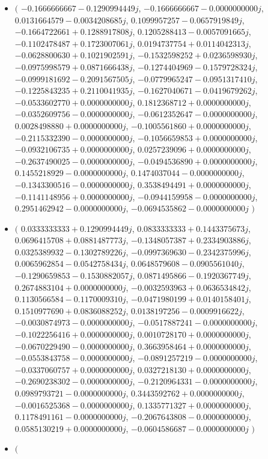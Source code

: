 \documentclass[14pt,a4paper]{article}
\begin{document}
\begin{itemize}
\item
$\big($
$-0.1666666667-0.1290994449j$, $-0.1666666667-0.0000000000j$, $0.0131664579-0.0034208685j$, $0.1099957257-0.0657919849j$, $-0.1664722661+0.1288917808j$, $0.1205288413-0.0057091665j$, $-0.1102478487+0.1723007061j$, $0.0194737754+0.0114042313j$, $-0.0628800630+0.1021902591j$, $-0.1532598252+0.0236598930j$, $-0.0975998579+0.0871666438j$, $-0.1274404969-0.1579728324j$, $-0.0999181692-0.2091567505j$, $-0.0779965247-0.0951317410j$, $-0.1225843235+0.2110041935j$, $-0.1627040671-0.0419679262j$, $-0.0533602770+0.0000000000j$, $0.1812368712+0.0000000000j$, $-0.0352609756-0.0000000000j$, $-0.0612352647-0.0000000000j$, $0.0028498880+0.0000000000j$, $-0.1005561860+0.0000000000j$, $-0.2115332390-0.0000000000j$, $-0.1056659853+0.0000000000j$, $-0.0932106735+0.0000000000j$, $0.0257239096+0.0000000000j$, $-0.2637490025-0.0000000000j$, $-0.0494536890+0.0000000000j$, $0.1455218929-0.0000000000j$, $0.1474037044-0.0000000000j$, $-0.1343300516-0.0000000000j$, $0.3538494491+0.0000000000j$, $-0.1141148956+0.0000000000j$, $-0.0944159958-0.0000000000j$, $0.2951462942-0.0000000000j$, $-0.0694535862-0.0000000000j$
$\big)$
\item
$\big($
$0.0333333333+0.1290994449j$, $0.0833333333+0.1443375673j$, $0.0696415708+0.0881487773j$, $-0.1348057387+0.2334903886j$, $0.0325389932-0.1302789226j$, $-0.0997369630-0.2342375996j$, $0.0065962854-0.0542758434j$, $0.0648579608-0.0905561040j$, $-0.1290659853-0.1530882057j$, $0.0871495866-0.1920367749j$, $0.2674883104+0.0000000000j$, $-0.0032593963+0.0636534842j$, $0.1130566584-0.1170009310j$, $-0.0471980199+0.0140158401j$, $0.1510977690+0.0836088252j$, $0.0138197256-0.0009916622j$, $-0.0030874973-0.0000000000j$, $-0.0517887241-0.0000000000j$, $-0.1022256416+0.0000000000j$, $0.0010728170+0.0000000000j$, $-0.0670229490-0.0000000000j$, $0.3663958464+0.0000000000j$, $-0.0553843758-0.0000000000j$, $-0.0891257219-0.0000000000j$, $-0.0337060757+0.0000000000j$, $0.0327218130+0.0000000000j$, $-0.2690238302-0.0000000000j$, $-0.2120964331-0.0000000000j$, $0.0989793721-0.0000000000j$, $0.3443592762+0.0000000000j$, $-0.0016525368-0.0000000000j$, $0.1335771327+0.0000000000j$, $0.1178491161-0.0000000000j$, $-0.2067643808-0.0000000000j$, $0.0585130219+0.0000000000j$, $-0.0604586687-0.0000000000j$
$\big)$
\item
$\big($

\end{itemize}
\end{document}
